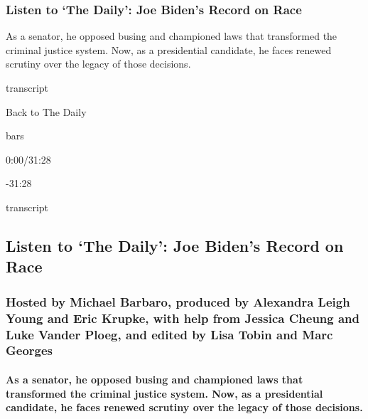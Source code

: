 \hypertarget{listen-to-the-daily-joe-bidens-record-on-race}{%
\subsubsection{Listen to `The Daily': Joe Biden's Record on
Race}\label{listen-to-the-daily-joe-bidens-record-on-race}}

As a senator, he opposed busing and championed laws that transformed the
criminal justice system. Now, as a presidential candidate, he faces
renewed scrutiny over the legacy of those decisions.

transcript

Back to The Daily

bars

0:00/31:28

-31:28

transcript

\hypertarget{listen-to-the-daily-joe-bidens-record-on-race-1}{%
\subsection{Listen to `The Daily': Joe Biden's Record on
Race}\label{listen-to-the-daily-joe-bidens-record-on-race-1}}

\hypertarget{hosted-by-michael-barbaro-produced-by-alexandra-leigh-young-and-eric-krupke-with-help-from-jessica-cheung-and-luke-vander-ploeg-and-edited-by-lisa-tobin-and-marc-georges}{%
\subsubsection{Hosted by Michael Barbaro, produced by Alexandra Leigh
Young and Eric Krupke, with help from Jessica Cheung and Luke Vander
Ploeg, and edited by Lisa Tobin and Marc
Georges}\label{hosted-by-michael-barbaro-produced-by-alexandra-leigh-young-and-eric-krupke-with-help-from-jessica-cheung-and-luke-vander-ploeg-and-edited-by-lisa-tobin-and-marc-georges}}

\hypertarget{as-a-senator-he-opposed-busing-and-championed-laws-that-transformed-the-criminal-justice-system-now-as-a-presidential-candidate-he-faces-renewed-scrutiny-over-the-legacy-of-those-decisions}{%
\paragraph{As a senator, he opposed busing and championed laws that
transformed the criminal justice system. Now, as a presidential
candidate, he faces renewed scrutiny over the legacy of those
decisions.}\label{as-a-senator-he-opposed-busing-and-championed-laws-that-transformed-the-criminal-justice-system-now-as-a-presidential-candidate-he-faces-renewed-scrutiny-over-the-legacy-of-those-decisions}}

